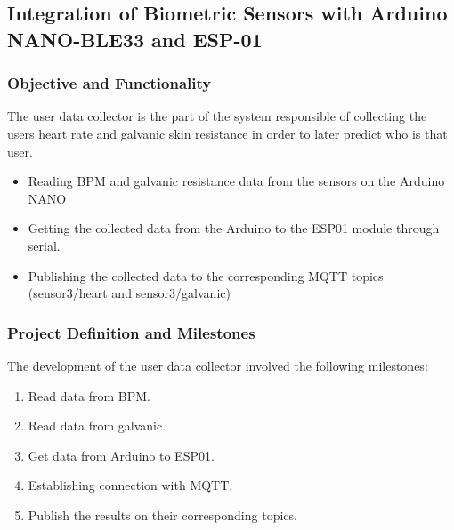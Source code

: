 \subsection{Integration of Biometric Sensors with Arduino NANO-BLE33 and ESP-01}

\subsubsection{Objective and Functionality}
The user data collector is the part of the system responsible of collecting the users heart rate and galvanic skin resistance in order to later predict who is that user.
\begin{itemize}
    \item Reading BPM and galvanic resistance data from the sensors on the Arduino NANO
    \item Getting the collected data from the Arduino to the ESP01 module through serial.
    \item Publishing the collected data to the corresponding MQTT topics (sensor3/heart and sensor3/galvanic)
\end{itemize}

\subsubsection{Project Definition and Milestones}
The development of the user data collector involved the following milestones:
\begin{enumerate}
    \item Read data from BPM.
    \item Read data from galvanic.
    \item Get data from Arduino to ESP01.
    \item Establishing connection with MQTT.
    \item Publish the results on their corresponding topics.
\end{enumerate}

